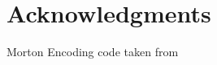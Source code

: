 \documentclass[fleqn,10pt]{SelfArx} %
\begin{document}
\section*{Acknowledgments} %
Morton Encoding code taken from \cite{Karras:2012}



\end{document}
